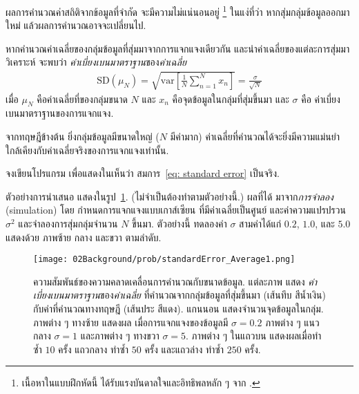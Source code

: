 \begin{Exercise}
	\label{ex: prob standard error of mean}

ผลการคำนวณค่าสถิติจากข้อมูลที่จำกัด จะมีความไม่แน่นอนอยู่%
\footnote{เนื้อหาในแบบฝึกหัดนี้ ได้รับแรงบันดาลใจและอิทธิพลหลัก ๆ จาก \cite{GoodfellowEtAl2016}.}
ในแง่ที่ว่า
หากสุ่มกลุ่มข้อมูลออกมาใหม่ แล้วผลการคำนวณอาจจะเปลี่ยนไป.

หากคำนวณค่าเฉลี่ยของกลุ่มข้อมูลที่สุ่มมาจากการแจกแจงเดียวกัน
และนำค่าเฉลี่ยของแต่ละการสุ่มมาวิเคราะห์
จะพบว่า\cite{GoodfellowEtAl2016}
\textit{ค่าเบี่ยงเบนมาตราฐาน}ของ\textit{ค่าเฉลี่ย}
\begin{eqnarray}
\mathrm{SD}(\mu_N) = \sqrt{\mathrm{var}\left[ \frac{1}{N} \sum_{n=1}^N x_n \right]} = \frac{\sigma}{\sqrt{N}}
\label{eq: standard error}
\end{eqnarray}
เมื่อ $\mu_N$ คือค่าเฉลี่ยที่ของกลุ่มขนาด $N$
และ $x_n$ คือจุดข้อมูลในกลุ่มที่สุ่มขึ้นมา
และ $\sigma$ คือ ค่าเบี่ยงเบนมาตราฐานของการแจกแจง.

จากทฤษฎีข้างต้น 
ยิ่งกลุ่มข้อมูลมีขนาดใหญ่ ($N$ มีค่ามาก)
ค่าเฉลี่ยที่คำนวณได้จะยิ่งมีความแม่นยำใกล้เคียงกับค่าเฉลี่ยจริงของการแจกแจงเท่านั้น.

จงเขียนโปรแกรม เพื่อแสดงในเห็นว่า
สมการ~\ref{eq: standard error} เป็นจริง.

ตัวอย่างการนำเสนอ แสดงในรูป~\ref{fig: prob stdev of mean}.
(ไม่จำเป็นต้องทำตามตัวอย่างนี้.)
ผลที่ได้ มาจาก\textit{การจำลอง} (simulation)
โดย กำหนดการแจกแจงแบบเกาส์เซียน ที่มีค่าเฉลี่ยเป็นศูนย์ และค่าความแปรปรวน $\sigma^2$
และจำลองการสุ่มกลุ่มจำนวน $N$ ขึ้นมา.
ตัวอย่างนี้ ทดลองค่า $\sigma$ สามค่าได้แก่ $0.2$, $1.0$, และ $5.0$ แสดงด้วย ภาพซ้าย กลาง และขวา ตามลำดับ.


	\begin{figure}[H]
	\begin{center}
		\texttt{[image: 02Background/prob/standardError\_Average1.png]}
	\end{center}
	\caption[ความสัมพันธ์ของความคลาดเคลื่อนการคำนวณกับขนาดข้อมูล]{
ความสัมพันธ์ของความคลาดเคลื่อนการคำนวณกับขนาดข้อมูล.
แต่ละภาพ แสดง \textit{ค่าเบี่ยงเบนมาตราฐาน}ของ\textit{ค่าเฉลี่ย} ที่คำนวณจากกลุ่มข้อมูลที่สุ่มขึ้นมา
(เส้นทึบ สีน้ำเงิน) กับค่าที่คำนวณทางทฤษฎี (เส้นประ สีแดง).
แกนนอน แสดงจำนวนจุดข้อมูลในกลุ่ม.
ภาพต่าง ๆ ทางซ้าย แสดงผล เมื่อการแจกแจงของข้อมูลมี $\sigma = 0.2$ 
ภาพต่าง ๆ แนวกลาง $\sigma = 1$
และภาพต่าง ๆ ทางขวา $\sigma = 5$.
ภาพต่าง ๆ ในแถวบน แสดงผลเมื่อทำซ้ำ $10$ ครั้ง
แถวกลาง ทำซ้ำ $50$ ครั้ง
และแถวล่าง ทำซ้ำ $250$ ครั้ง.
}
	\label{fig: prob stdev of mean}
\end{figure}


\end{Exercise}
